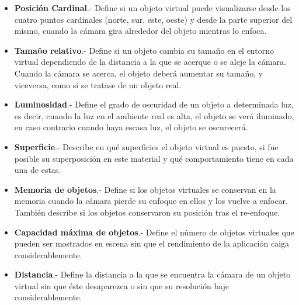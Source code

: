 \begin{itemize}
	\item \textbf{Posición Cardinal}.- Define si un objeto virtual puede visualizarse desde los cuatro puntos cardinales (norte, sur, este, oeste) y desde la parte superior del mismo, cuando la cámara gira alrededor del objeto mientras lo enfoca.
	\item \textbf{Tamaño relativo}.- Define si un objeto cambia su tamaño en el entorno virtual dependiendo de la distancia a la que se acerque o se aleje la cámara. Cuando la cámara se acerca, el objeto deberá aumentar su tamaño, y viceversa, como si se tratase de un objeto real.
	\item \textbf{Luminosidad}.- Define el grado de oscuridad de un objeto a determinada luz, es decir, cuando la luz en el ambiente real es alta, el objeto se verá iluminado, en caso contrario cuando haya escasa luz, el objeto se oscurecerá.
	\item \textbf{Superficie}.- Describe en qué superficies el objeto virtual es puesto, si fue posible su superposición en este material y qué comportamiento tiene en cada una de estas.
	\item \textbf{Memoria de objetos}.- Define si los objetos virtuales se conservan en la memoria cuando la cámara pierde su enfoque en ellos y los vuelve a enfocar. También describe si los objetos conservaron su posición tras el re-enfoque.
	\item \textbf{Capacidad máxima de objetos}.- Define el número de objetos virtuales que pueden ser mostrados en escena sin que el rendimiento de la aplicación caiga considerablemente.
	\item \textbf{Distancia}.- Define la distancia a la que se encuentra la cámara de un objeto virtual sin que éste desaparezca o sin que su resolución baje considerablemente.
\end{itemize}
\noindent





